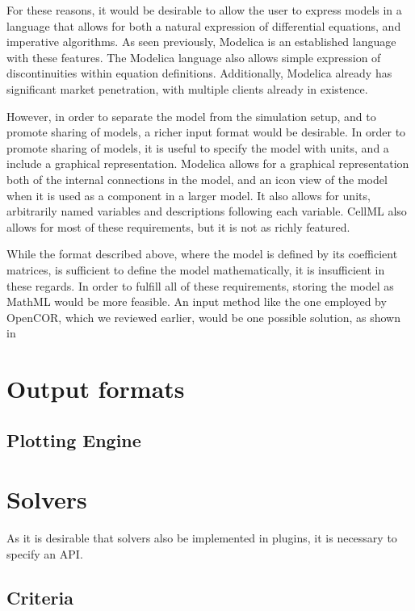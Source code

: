 \documentclass[\rootfolder/main.tex]{subfiles}
\begin{document}
For these reasons, it would be desirable to allow the user to express models in a language that allows for both a natural expression of differential equations, and imperative algorithms.
As seen previously, Modelica is an established language with these features.
The Modelica language also allows simple expression of discontinuities within equation definitions.
Additionally, Modelica already has significant market penetration, with multiple clients already in existence.

However, in order to separate the model from the simulation setup, and to promote sharing of models, a richer input format would be desirable.
In order to promote sharing of models, it is useful to specify the model with units, and a include a graphical representation.
Modelica allows for a graphical representation both of the internal connections in the model, and an icon view of the model when it is used as a component in a larger model.
It also allows for units, arbitrarily named variables and descriptions following each variable.
CellML also allows for most of these requirements, but it is not as richly featured.

While the format described above, where the model is defined by its coefficient matrices, is sufficient to define the model mathematically, it is insufficient in these regards.
In order to fulfill all of these requirements, storing the model as MathML would be more feasible.
An input method like the one employed by OpenCOR, which we reviewed earlier, would be one possible solution, as shown in %

\section{Output formats}

\subsection{Plotting Engine}

\section{Solvers}

As it is desirable that solvers also be implemented in plugins, it is necessary to specify an API.

\subsection{Criteria}
\end{document}
